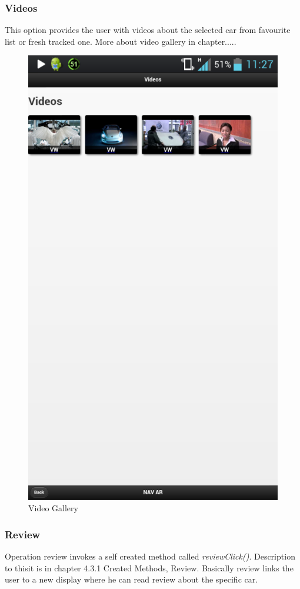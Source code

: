 \subsubsection{Videos}
This option provides the user with videos about the selected car from favourite list or fresh tracked one. More about video gallery in chapter.....
\\
\begin{figure}[h]
\centering
\includegraphics[width=0.5\linewidth]{graphics/chapter4/8}
\caption{Video Gallery}
\end{figure}
\newpage

\subsubsection{Review}
Operation review invokes a self created method called \textit{reviewClick()}. Description to thisit is in chapter 4.3.1 Created Methods, Review. Basically review links the user to a new display where he can read review about the specific car.
\\

